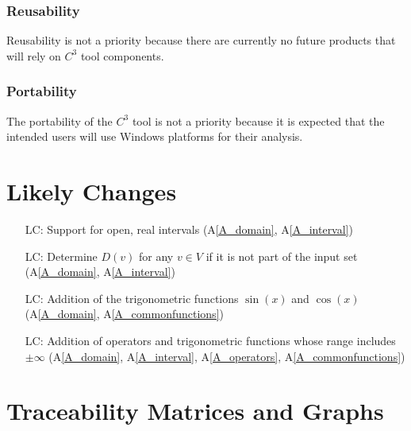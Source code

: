 \documentclass[12pt]{article}
\newcommand{\aref}[1]{A\ref{#1}}
\newcounter{lcnum} %
\newcommand{\prognameAbbrv}{$C^{3}$}
\begin{document}
\subsubsection*{Reusability}
Reusability is not a priority because there are currently no future products 
that will rely on \prognameAbbrv{} tool components.

\subsubsection*{Portability}
The portability of the \prognameAbbrv{} tool is not a priority because it is 
expected that the intended users will use Windows platforms for their analysis.

\section{Likely Changes}    
\label{changes}

\noindent \begin{itemize}

\item[LC\refstepcounter{lcnum}\thelcnum\label{LC_openinterval}:] Support for 
open, real intervals (\aref{A_domain}, \aref{A_interval})

\item[LC\refstepcounter{lcnum}\thelcnum\label{LC_unknownDomain}:] Determine 
$D(v)$ for any $v \in V$ if it is not part of the input set (\aref{A_domain}, 
\aref{A_interval})

\item[LC\refstepcounter{lcnum}\thelcnum\label{LC_trig}:] Addition of the 
trigonometric functions $\sin(x)$ and $\cos(x)$ (\aref{A_domain}, 
\aref{A_commonfunctions})

\item[LC\refstepcounter{lcnum}\thelcnum\label{LC_infinity}:] Addition of 
operators and trigonometric functions whose range includes $\pm\infty$ 
(\aref{A_domain}, \aref{A_interval}, \aref{A_operators}, 
\aref{A_commonfunctions})

\end{itemize}

\section{Traceability Matrices and Graphs}
\label{trace}
\end{document}
